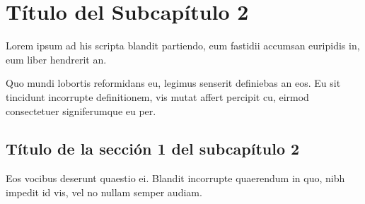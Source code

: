 \section{Título del Subcapítulo 2} \label{chsub:Título del Subcapítulo 2}

\parindent=0pt Lorem ipsum ad his scripta blandit partiendo, eum fastidii accumsan euripidis in, eum liber hendrerit an. 

\vspace{0.5cm}
\parindent=30pt Quo mundi lobortis reformidans eu, legimus senserit definiebas an eos. Eu sit tincidunt incorrupte definitionem, vis mutat affert percipit cu, eirmod consectetuer signiferumque eu per.

\subsection{Título de la sección 1 del subcapítulo 2}\label{chsub:Título de la sección 1 del subcapítulo 2}

\parindent=0pt Eos vocibus deserunt quaestio ei. Blandit incorrupte quaerendum in quo, nibh impedit id vis, vel no nullam semper audiam. 

